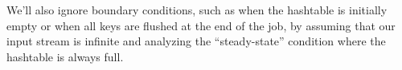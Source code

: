 \documentclass[twocolumn, 10pt]{article}
\begin{document}
We'll also ignore boundary conditions, such as when the hashtable is initially
empty or when all keys are flushed at the end of the job, by assuming that
our input stream is infinite and analyzing the ``steady-state'' condition where
the hashtable is always full.






%
\end{document}
